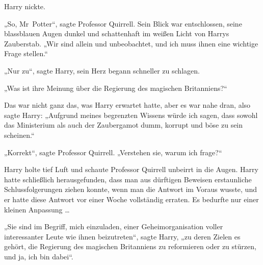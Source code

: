 Harry nickte.

„So, Mr~Potter“, sagte Professor Quirrell. Sein Blick war entschlossen, seine blassblauen Augen dunkel und schattenhaft im weißen Licht von Harrys Zauberstab.
„Wir sind allein und unbeobachtet, und ich muss ihnen eine wichtige Frage stellen.“

„Nur zu“, sagte Harry, sein Herz begann schneller zu schlagen.

„Was ist ihre Meinung über die Regierung des magischen Britanniens?“

Das war nicht ganz das, was Harry erwartet hatte, aber es war nahe dran, also sagte Harry:
„Aufgrund meines begrenzten Wissens würde ich sagen, dass sowohl das Ministerium als auch der Zaubergamot dumm, korrupt und böse zu sein scheinen.“

„Korrekt“, sagte Professor Quirrell.
„Verstehen sie, warum ich frage?“

Harry holte tief Luft und schaute Professor Quirrell unbeirrt in die Augen. Harry hatte schließlich herausgefunden, dass man aus dürftigen Beweisen erstaunliche Schlussfolgerungen ziehen konnte, wenn man die Antwort im Voraus wusste, und er hatte diese Antwort vor einer Woche vollständig erraten. Es bedurfte nur einer kleinen Anpassung …

„Sie sind im Begriff, mich einzuladen, einer Geheimorganisation voller interessanter Leute wie ihnen beizutreten“, sagte Harry, „zu deren Zielen es gehört, die Regierung des magischen Britanniens zu reformieren oder zu stürzen, und ja, ich bin dabei“.

